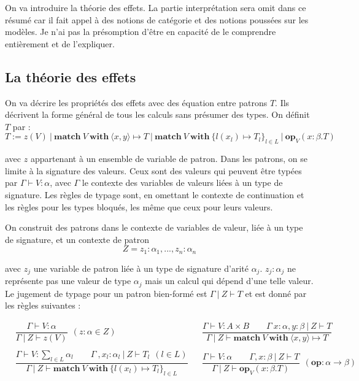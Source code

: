 On va introduire la théorie des effets. La partie interprétation sera omit dans ce résumé car il fait appel à des notions de catégorie et des notions poussées sur les modèles. Je n'ai pas la présomption d'être en capacité de le comprendre entièrement et de l'expliquer.

\subsection{La théorie des effets}

	On va décrire les propriétés des effets avec des équation entre patrons $T$. Ils décrivent la forme général de tous les calculs sans présumer des types. On définit $T$ par :
	\[T := z(V)~|~\textbf{match}~V~\textbf{with}~\langle x,y\rangle \mapsto T~|~\textbf{match}~V~\textbf{with}~\{l(x_l) \mapsto T_l\}_{l \in L}~|~\textbf{op}_V(x:\beta.T)\]
	
	avec $z$ appartenant à un ensemble de variable de patron. Dans les patrons, on se limite à la signature des valeurs. Ceux sont des valeurs qui peuvent être typées par $\Gamma \vdash V:\alpha$, avec $\Gamma$ le contexte des variables de valeurs liées à un type de signature. Les règles de typage sont, en omettant le contexte de continuation et les règles pour les types bloqués, les même que ceux pour leurs valeurs.
	\medbreak
	
	On construit des patrons dans le contexte de variables de valeur, liée à un type de signature, et un contexte de patron
	\[Z = z_1:\alpha_1,...,z_n:\alpha_n\] 
	
	avec $z_j$ une variable de patron liée à un type de signature d'arité $\alpha_j$. $z_j:\alpha_j$ ne représente pas une valeur de type $\alpha_j$ mais un calcul qui dépend d'une telle valeur.
	Le jugement de typage pour un patron bien-formé est $\Gamma~|~Z \vdash T$ et est donné par les règles suivantes :
	
	\begin{align*}
		&\dfrac{\Gamma \vdash V:\alpha}{\Gamma~|~Z \vdash z(V)}~~(z:\alpha \in Z) &
		&\dfrac{\Gamma \vdash V : A \times B\quad\quad\Gamma~x:\alpha,y:\beta~|~Z \vdash T}{\Gamma~|~Z \vdash \textbf{match}~V~\textbf{with}~\langle x,y\rangle  \mapsto T} \\\\
		&\dfrac{\Gamma \vdash V : \sum_{l \in L}\alpha_l\quad\quad\Gamma~,x_l:\alpha_l~|~Z \vdash T_l~~(l\in L)}{\Gamma~|~Z \vdash \textbf{match}~V~\textbf{with}~\{ l(x_l) \mapsto T_l\}_{l \in L}} &
		&\dfrac{\Gamma \vdash V:\alpha\quad\quad\Gamma,x:\beta~|~Z \vdash T}{\Gamma~|~Z \vdash \textbf{op}_V(x:\beta.T)}~~(\textbf{op}:\alpha \rightarrow \beta)\\
	\end{align*}
	
